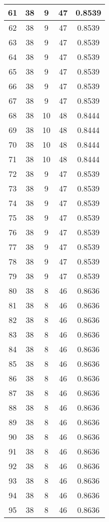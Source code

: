 \documentclass[letterpaper, 12pt]{article}
\begin{document}
\begin{longtable}{|c|c|c|c|c|}
\hline
61 & 38 & 9 & 47 & 0.8539 \\
\hline
62 & 38 & 9 & 47 & 0.8539 \\
\hline
63 & 38 & 9 & 47 & 0.8539 \\
\hline
64 & 38 & 9 & 47 & 0.8539 \\
\hline
65 & 38 & 9 & 47 & 0.8539 \\
\hline
66 & 38 & 9 & 47 & 0.8539 \\
\hline
67 & 38 & 9 & 47 & 0.8539 \\
\hline
68 & 38 & 10 & 48 & 0.8444 \\
\hline
69 & 38 & 10 & 48 & 0.8444 \\
\hline
70 & 38 & 10 & 48 & 0.8444 \\
\hline
71 & 38 & 10 & 48 & 0.8444 \\
\hline
72 & 38 & 9 & 47 & 0.8539 \\
\hline
73 & 38 & 9 & 47 & 0.8539 \\
\hline
74 & 38 & 9 & 47 & 0.8539 \\
\hline
75 & 38 & 9 & 47 & 0.8539 \\
\hline
76 & 38 & 9 & 47 & 0.8539 \\
\hline
77 & 38 & 9 & 47 & 0.8539 \\
\hline
78 & 38 & 9 & 47 & 0.8539 \\
\hline
79 & 38 & 9 & 47 & 0.8539 \\
\hline
80 & 38 & 8 & 46 & 0.8636 \\
\hline
81 & 38 & 8 & 46 & 0.8636 \\
\hline
82 & 38 & 8 & 46 & 0.8636 \\
\hline
83 & 38 & 8 & 46 & 0.8636 \\
\hline
84 & 38 & 8 & 46 & 0.8636 \\
\hline
85 & 38 & 8 & 46 & 0.8636 \\
\hline
86 & 38 & 8 & 46 & 0.8636 \\
\hline
87 & 38 & 8 & 46 & 0.8636 \\
\hline
88 & 38 & 8 & 46 & 0.8636 \\
\hline
89 & 38 & 8 & 46 & 0.8636 \\
\hline
90 & 38 & 8 & 46 & 0.8636 \\
\hline
91 & 38 & 8 & 46 & 0.8636 \\
\hline
92 & 38 & 8 & 46 & 0.8636 \\
\hline
93 & 38 & 8 & 46 & 0.8636 \\
\hline
94 & 38 & 8 & 46 & 0.8636 \\
\hline
95 & 38 & 8 & 46 & 0.8636 \\

\end{longtable}
\end{document}
